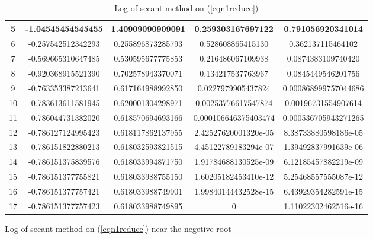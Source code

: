 \begin{table}[H]
\begin{table}[H]
\begin{table}[H]
\begin{table}[H]
\begin{table}[htbp]
\begin{subtable}[t]{\textwidth}
\begin{tabular}{|c|c|c|c|c|}
		5	&	\footnotesize	-1.04545454545455		&	\footnotesize	1.40909090909091	&	\footnotesize	0.259303167697122		&	\footnotesize	0.791056920341014		\\	\hline
		6	&	\footnotesize	-0.257542512342293		&	\footnotesize	0.255896873285793	&	\footnotesize	0.528608865415130		&	\footnotesize	0.362137115464102		\\	\hline
		7	&	\footnotesize	-0.569665310647485		&	\footnotesize	0.530595677775853	&	\footnotesize	0.216486067109938		&	\footnotesize	0.0874383109740420		\\	\hline
		8	&	\footnotesize	-0.920368915521390		&	\footnotesize	0.702578943370071	&	\footnotesize	0.134217537763967		&	\footnotesize	0.0845449546201756		\\	\hline
		9	&	\footnotesize	-0.763353387213641		&	\footnotesize	0.617164988992850	&	\footnotesize	0.0227979905437824		&	\footnotesize	0.000868999757044686	\\	\hline
		10	&	\footnotesize	-0.783613611581945		&	\footnotesize	0.620001304298971	&	\footnotesize	0.00253776617547874		&	\footnotesize	0.00196731554907614		\\	\hline
		11	&	\footnotesize	-0.786044731382020		&	\footnotesize	0.618570694693166	&	\footnotesize	0.000106646375403474	&	\footnotesize	0.000536705943271265	\\	\hline
		12	&	\footnotesize	-0.786127124995423		&	\footnotesize	0.618117862137955	&	\footnotesize	2.42527620001320e-05	&	\footnotesize	8.38733880598186e-05	\\	\hline
		13	&	\footnotesize	-0.786151822880213		&	\footnotesize	0.618032593821515	&	\footnotesize	4.45122789183294e-07	&	\footnotesize	1.39492837991639e-06	\\	\hline
		14	&	\footnotesize	-0.786151375839576		&	\footnotesize	0.618033994871750	&	\footnotesize	1.91784688130525e-09	&	\footnotesize	6.12185457882219e-09	\\	\hline
		15	&	\footnotesize	-0.786151377755821		&	\footnotesize	0.618033988755150	&	\footnotesize	1.60205182453410e-12	&	\footnotesize	5.25468557555087e-12	\\	\hline
		16	&	\footnotesize	-0.786151377757421		&	\footnotesize	0.618033988749901	&	\footnotesize	1.99840144432528e-15	&	\footnotesize	6.43929354282591e-15	\\	\hline
		17	&	\footnotesize	-0.786151377757423		&	\footnotesize	0.618033988749895	&	\footnotesize	0						&	\footnotesize	1.11022302462516e-16	\\	\hline
		\end{tabular}
		\caption{Log of secant method on (\ref{eqn1reduce}) near the negetive root}
		\label{logeqn1se-}
	\end{subtable}
	\caption{Log of secant method on (\ref{eqn1reduce})}
	\label{logeqn1se}
	\end{table}




\end{table}
\end{table}
\end{table}
\end{table}
